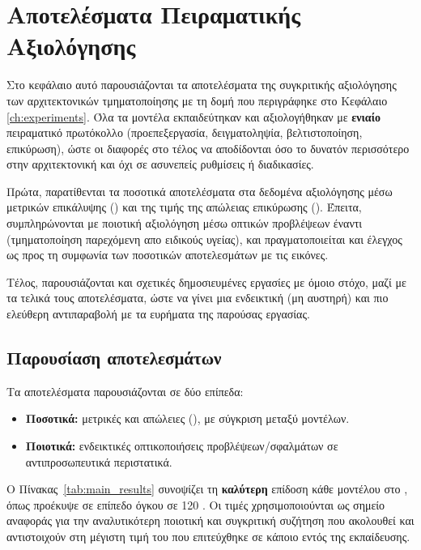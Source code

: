 \chapter{Αποτελέσματα Πειραματικής Αξιολόγησης}
\label{ch:results}

Στο κεφάλαιο αυτό παρουσιάζονται τα αποτελέσματα της συγκριτικής αξιολόγησης των αρχιτεκτονικών 
τμηματοποίησης με τη δομή που περιγράφηκε στο Κεφάλαιο \ref{ch:experiments}. 
Όλα τα μοντέλα εκπαιδεύτηκαν και αξιολογήθηκαν με \textbf{ενιαίο} πειραματικό πρωτόκολλο 
(προεπεξεργασία, δειγματοληψία, βελτιστοποίηση, επικύρωση), ώστε οι διαφορές στο τέλος να αποδίδονται όσο το δυνατόν περισσότερο στην αρχιτεκτονική και όχι σε ασυνεπείς ρυθμίσεις ή διαδικασίες.

Πρώτα, παρατίθενται τα ποσοτικά αποτελέσματα στα δεδομένα αξιολόγησης μέσω μετρικών επικάλυψης 
() και της τιμής της απώλειας επικύρωσης (). 
Έπειτα, συμπληρώνονται με ποιοτική αξιολόγηση μέσω οπτικών προβλέψεων έναντι 
 (τμηματοποίηση παρεχόμενη απο ειδικούς υγείας), 
και πραγματοποιείται και έλεγχος ως προς τη συμφωνία των ποσοτικών αποτελεσμάτων με τις εικόνες.

Τέλος, παρουσιάζονται και σχετικές δημοσιευμένες εργασίες με όμοιο στόχο,
μαζί με τα τελικά τους αποτελέσματα, ώστε να γίνει μια ενδεικτική (μη αυστηρή)
και πιο ελεύθερη αντιπαραβολή με τα ευρήματα της παρούσας εργασίας.

\section{Παρουσίαση αποτελεσμάτων}
\label{sec:exp_results}
Τα αποτελέσματα παρουσιάζονται σε δύο επίπεδα:
\begin{itemize}
  \item \textbf{Ποσοτικά:} μετρικές  και απώλειες (), με σύγκριση μεταξύ μοντέλων.
  \item \textbf{Ποιοτικά:} ενδεικτικές οπτικοποιήσεις προβλέψεων/σφαλμάτων
        σε αντιπροσωπευτικά περιστατικά.
\end{itemize}
Ο Πίνακας~\ref{tab:main_results} συνοψίζει τη \textbf{καλύτερη} επίδοση κάθε μοντέλου στο 
, όπως προέκυψε σε επίπεδο  όγκου σε 120 . 
Οι τιμές  χρησιμοποιούνται ως σημείο αναφοράς για την αναλυτικότερη ποιοτική και συγκριτική συζήτηση που ακολουθεί και αντιστοιχούν στη μέγιστη τιμή του  που επιτεύχθηκε σε κάποιο  εντός της εκπαίδευσης.

